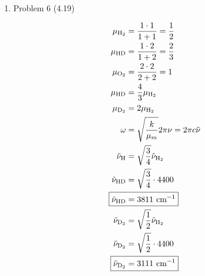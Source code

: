 \documentclass[12pt]{article}
\begin{document}
\begin{enumerate}
    b.

    \begin{align*}
        2\pi\nu &= \sqrt{\frac{k}{m}} \\
        k &= \left(2\pi\nu\right)^2 m \\
        k &= \left(2\pi\cdot 0.805\right)^2 \cdot 20 \\
        \Aboxed{k &= 512 \text{ N/m} }
    \end{align*}

    c. The reason it is said that the chemical bond is compared to a mechanical spring, this is in characteristic that the chemical bond acts like a very strong spring. In essence, the spring in (b) holds 20 kg mass.
    
    \newpage
    \item Problem 6 (4.19)
    
    \begin{align*}
        \mu_{\text{H}_2} &= \frac{1\cdot1}{1+1} = \frac{1}{2} \\
        \mu_{\text{HD}} &= \frac{1\cdot2}{1+2} = \frac{2}{3} \\
        \mu_{\text{O}_2} &= \frac{2\cdot2}{2+2} = 1 \\
        \mu_{\text{HD}} &= \frac{4}{3} \mu_{\text{H}_2} \\
        \mu_{\text{D}_2} &= 2 \mu_{\text{H}_2} \\
        \omega &= \sqrt{\frac{k}{\mu_m}} 2\pi\nu = 2\pi c\tilde{\nu} \\
        \tilde{\nu}_{\text{H}} &= \sqrt{\frac{3}{4}} \tilde{\nu}_{\text{H}_2} \\
        \tilde{\nu}_{\text{HD}} &= \sqrt{\frac{3}{4}} \cdot 4400 \\
        \Aboxed{\tilde{\nu}_{\text{HD}} &= 3811 \text{ cm$^{-1}$}} \\
        \tilde{\nu}_{\text{D}_2} &= \sqrt{\frac{1}{2}} \tilde{\nu}_{\text{H}_2} \\
        \tilde{\nu}_{\text{D}_2} &= \sqrt{\frac{1}{2}} \cdot 4400 \\
        \Aboxed{\tilde{\nu}_{\text{D}_2} &= 3111 \text{ cm$^{-1}$}}
    \end{align*}

\end{enumerate}
\end{document}

